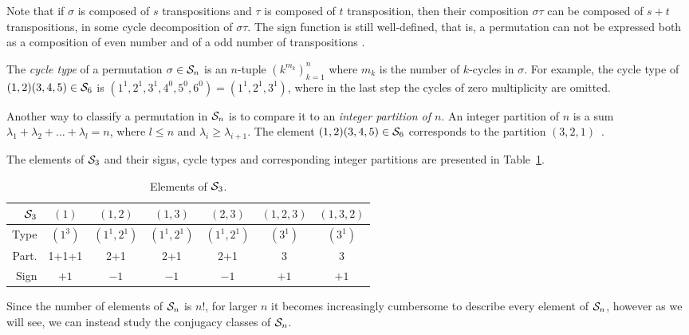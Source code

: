Note that if $\sigma$ is composed of $s$ transpositions and $\tau$ is composed of $t$ transposition, then their composition $\sigma\tau$ can be composed of $s+t$ transpositions, in some cycle decomposition of $\sigma\tau$. The sign function is still well-defined, that is, a permutation can not be expressed both as a composition of even number and of a odd number of transpositions \cite[Thm.12.6.1.]{Biggs}.

The \textit{cycle type} of a permutation $\sigma \in \mathcal{S}_n$ is an $n$-tuple $(k^{m_k})_{k=1}^n$ where $m_k$ is the number of $k$-cycles in $\sigma$. For example, the cycle type of $(1,2)(3,4,5) \in \mathcal{S}_6$ is $(1^1, 2^1, 3^1, 4^0, 5^0, 6^0) = (1^1, 2^1, 3^1)$, where in the last step the cycles of zero multiplicity are omitted.

Another way to classify a permutation in $\mathcal{S}_n$ is to compare it to an \textit{integer partition of $n$}. An integer partition of $n$ is a sum $\lambda_1+ \lambda_2+ \dots+ \lambda_l = n$, where $l \leq n$ and $\lambda_i \geq \lambda_{i+1}$. The element $(1,2)(3,4,5) \in \mathcal{S}_6$ corresponds to the partition $(3,2,1)$~\cite[Sect.1.1.]{Sagan}.  

\begin{example}[$\Sym_3$]
	The elements of $\Sym_3$ and their signs,  cycle types and corresponding integer partitions are presented in Table~\ref{table:elementsSym3}.
\end{example}

\begin{table}[hbt!]
	\centering
	\begin{tabular}{r | c c c c c c }
		$\Sym_3$ & $(1)$   & $(1,2)$     & $(1,3)$     & $(2,3)$     & $(1,2,3)$ & $(1,3,2)$ \\ \hline
		    Type & $(1^3)$ & $(1^1,2^1)$ & $(1^1,2^1)$ & $(1^1,2^1)$ & $(3^1)$   & $(3^1)$   \\
		   Part. & 1+1+1   & 2+1         & 2+1         & 2+1         & 3         & 3         \\
		   Sign  & $+1$    & $-1$        & $-1$        & $-1$        & $+1$      & $+1$
	\end{tabular}
	\caption{Elements of $\Sym_3$.}
	\label{table:elementsSym3}
\end{table}

Since the number of elements of $\mathcal{S}_n$ is $n!$, for larger $n$ it becomes increasingly cumbersome to describe every element of $\mathcal{S}_n$, however as we will see, we can instead study the conjugacy classes of $\mathcal{S}_n$.

